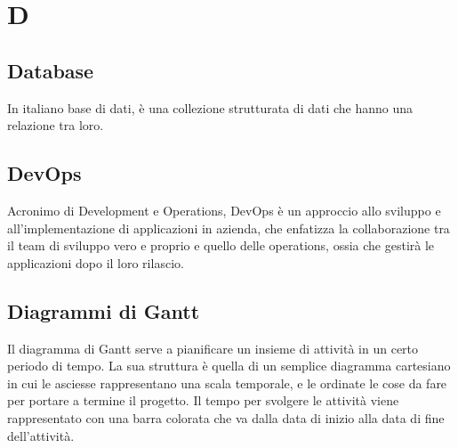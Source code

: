 \section*{D}

\subsection{Database}
In italiano base di dati, è una collezione strutturata di dati che hanno una relazione tra loro.

\subsection{DevOps}
Acronimo di Development e Operations, DevOps è un approccio allo sviluppo e all’implementazione di applicazioni in azienda, che enfatizza la collaborazione tra il team di sviluppo vero e proprio e quello delle operations, ossia che gestirà le applicazioni dopo il loro rilascio.

\subsection{Diagrammi di Gantt}
Il diagramma di Gantt serve a pianificare un insieme di attività in un certo periodo di tempo. La sua struttura è quella di un semplice diagramma cartesiano in cui le asciesse rappresentano una scala temporale, e le ordinate le cose da fare per portare a termine il progetto. Il tempo per svolgere le attività viene rappresentato con una barra colorata che va dalla data di inizio alla data di fine dell'attività.

